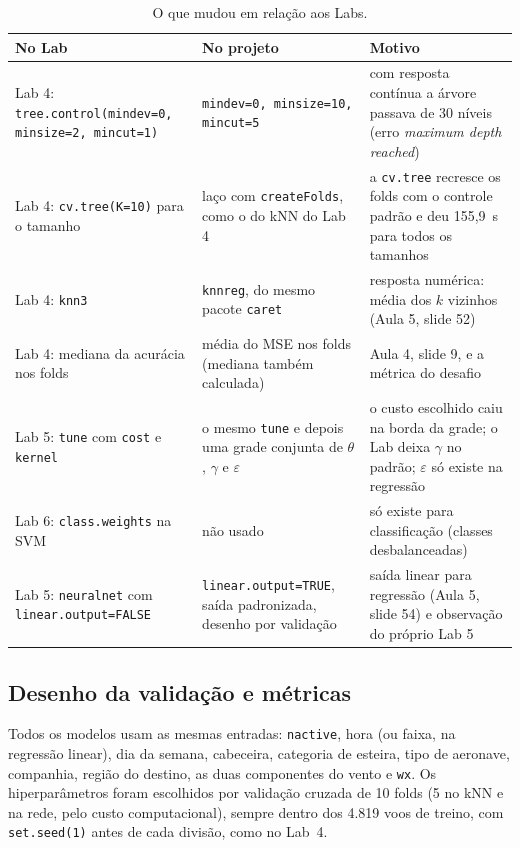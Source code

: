 \documentclass[12pt,a4paper]{article}
\begin{document}
\begin{table}[H]\centering\scriptsize
\caption{O que mudou em relação aos Labs.}\label{tab:mudancas}
\begin{tabular}{p{4.1cm}p{4.1cm}p{5.9cm}}
\toprule
No Lab & No projeto & Motivo\\
\midrule
Lab 4: \texttt{tree.control(mindev=0, minsize=2, mincut=1)} & \texttt{mindev=0, minsize=10, mincut=5} & com resposta contínua a árvore passava de 30 níveis (erro \textit{maximum depth reached})\\
Lab 4: \texttt{cv.tree(K=10)} para o tamanho & laço com \texttt{createFolds}, como o do kNN do Lab 4 & a \texttt{cv.tree} recresce os folds com o controle padrão e deu 155,9~s para todos os tamanhos\\
Lab 4: \texttt{knn3} & \texttt{knnreg}, do mesmo pacote \texttt{caret} & resposta numérica: média dos $k$ vizinhos (Aula 5, slide 52)\\
Lab 4: mediana da acurácia nos folds & média do MSE nos folds (mediana também calculada) & Aula 4, slide 9, e a métrica do desafio\\
Lab 5: \texttt{tune} com \texttt{cost} e \texttt{kernel} & o mesmo \texttt{tune} e depois uma grade conjunta de $\theta$, $\gamma$ e $\varepsilon$ & o custo escolhido caiu na borda da grade; o Lab deixa $\gamma$ no padrão; $\varepsilon$ só existe na regressão\\
Lab 6: \texttt{class.weights} na SVM & não usado & só existe para classificação (classes desbalanceadas)\\
Lab 5: \texttt{neuralnet} com \texttt{linear.output=FALSE} & \texttt{linear.output=TRUE}, saída padronizada, desenho por validação & saída linear para regressão (Aula 5, slide 54) e observação do próprio Lab 5\\
\bottomrule
\end{tabular}
\end{table}

\subsection{Desenho da validação e métricas}\label{sec:validacao}

Todos os modelos usam as mesmas entradas: \texttt{nactive}, hora (ou faixa, na regressão linear), dia da semana, cabeceira, categoria de esteira, tipo de aeronave, companhia, região do destino, as duas componentes do vento e \texttt{wx}. Os hiperparâmetros foram escolhidos por validação cruzada de 10 folds (5 no kNN e na rede, pelo custo computacional), sempre dentro dos 4.819 voos de treino, com \texttt{set.seed(1)} antes de cada divisão, como no Lab~4.
\end{document}
